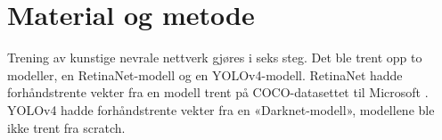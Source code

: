 


\section{Material og metode}
\label{part:method}




Trening av kunstige nevrale nettverk gjøres i seks steg. Det ble trent opp to modeller, en RetinaNet-modell og en YOLOv4-modell. RetinaNet hadde forhåndstrente vekter fra en modell trent på COCO-datasettet til Microsoft \cite{Lin m.fl. 2015 s. 1}. YOLOv4 hadde forhåndstrente vekter fra en «Darknet-modell», modellene ble ikke trent fra scratch. %

